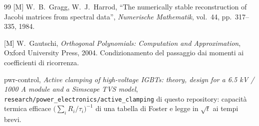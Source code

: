 \documentclass[10pt,a4paper]{scrartcl}
\begin{document}
\begin{thebibliography}{99}
[M] W.~B.~Gragg, W.~J.~Harrod, ``The numerically stable reconstruction of Jacobi matrices from spectral data'', \emph{Numerische Mathematik}, vol.~44, pp.~317--335, 1984.

[M] W.~Gautschi, \emph{Orthogonal Polynomials: Computation and Approximation}, Oxford University Press, 2004. Condizionamento del passaggio dai momenti ai coefficienti di ricorrenza.

pwr-control, \emph{Active clamping of high-voltage IGBTs: theory, design for a 6.5 kV / 1000 A module and a Simscape TVS model}, \texttt{research/power\_electronics/active\_clamping} di questo repository: capacità termica efficace $\bigl(\sum_i R_i/\tau_i\bigr)^{-1}$ di una tabella di Foster e legge in $\sqrt{t}$ ai tempi brevi.

\end{thebibliography}
\end{document}
